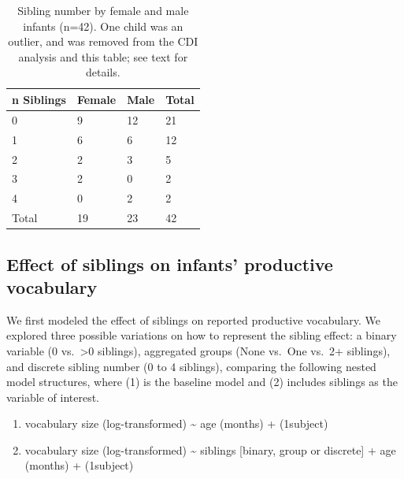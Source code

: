 \documentclass[
  man,floatsintext]{apa6}
\providecommand{\tightlist}{%
  \setlength{\itemsep}{0pt}\setlength{\parskip}{0pt}}
\begin{document}
\begin{table}[tbp]

\begin{center}
\begin{threeparttable}

\caption{\label{tab:table-sibling-number}Sibling number by female and male infants (n=42). One child was an outlier, and was removed from the CDI analysis and this table; see text for details.}

\small{

\begin{tabular}{llll}
\toprule
n Siblings & \multicolumn{1}{c}{Female} & \multicolumn{1}{c}{Male} & \multicolumn{1}{c}{Total}\\
\midrule
0 & 9 & 12 & 21\\
1 & 6 & 6 & 12\\
2 & 2 & 3 & 5\\
3 & 2 & 0 & 2\\
4 & 0 & 2 & 2\\
Total & 19 & 23 & 42\\
\bottomrule
\end{tabular}

}

\end{threeparttable}
\end{center}

\end{table}

\hypertarget{effect-of-siblings-on-infants-productive-vocabulary}{%
\subsection{Effect of siblings on infants' productive vocabulary}\label{effect-of-siblings-on-infants-productive-vocabulary}}

We first modeled the effect of siblings on reported productive vocabulary. We explored three possible variations on how to represent the sibling effect: a binary variable (0 vs.~\textgreater0 siblings), aggregated groups (None vs.~One vs.~2+ siblings), and discrete sibling number (0 to 4 siblings), comparing the following nested model structures, where (1) is the baseline model and (2) includes siblings as the variable of interest.

\begin{enumerate}
\def\labelenumi{\arabic{enumi}.}
\tightlist
\item
  vocabulary size (log-transformed) \textasciitilde{} age (months) + (1\textbar subject)
\item
  vocabulary size (log-transformed) \textasciitilde{} siblings {[}binary, group or discrete{]} + age (months) + (1\textbar subject)
\end{enumerate}
\end{document}
